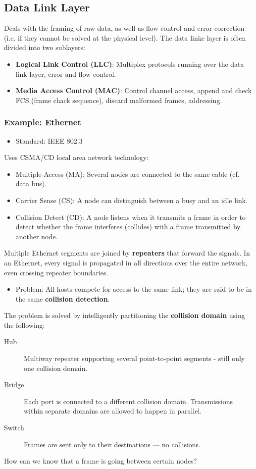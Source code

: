 \documentclass{article}%
\begin{document}
\subsection{Data Link Layer}
\label{sec:org3fb3528}
Deals with the framing of raw data, as well as flow control and error correction (i.e. if they cannot be solved at the physical level).
The data linke layer is often divided into two sublayers:
\begin{itemize}
\item \textbf{Logical Link Control (LLC)}: Multiplex protocols running over the data link layer, error and flow control.
\item \textbf{Media Access Control (MAC)}: Control channel access, append and check FCS (frame chack sequence), discard malformed frames, addressing.
\end{itemize}

\subsubsection{Example: Ethernet}
\label{sec:orgbca43ec}
\begin{itemize}
\item Standard: IEEE 802.3
\end{itemize}

Uses CSMA/CD local area network technology:
\begin{itemize}
\item Multiple-Access (MA): Several nodes are connected to the same cable (cf. data bus).
\item Carrier Sense (CS): A node can distinguish between a busy and an idle link.
\item Collision Detect (CD): A node listens when it transmits a frame in order to detect whether the frame interferes (collides) with a frame transmitted by another node.
\end{itemize}
Multiple Ethernet segments are joined by \textbf{repeaters} that forward the signals.
In an Ethernet, every signal is propagated in all directions over the entire network, even crossing repeater boundaries.
\begin{itemize}
\item Problem: All hosts compete for access to the same link; they are said to be in the same \textbf{collision detection}.
\end{itemize}
The problem is solved by intelligently partitioning the \textbf{collision domain} using the following:
\begin{description}
\item[{Hub}] Multiway repeater supporting several point-to-point segments - still only one collision domain.
\item[{Bridge}] Each port is connected to a different collision domain. Transmissions within separate domains are allowed to happen in parallel.
\item[{Switch}] Frames are sent only to their destinations --- no collisions.
\end{description}
How can we know that a frame is going between certain nodes?
\end{document}

